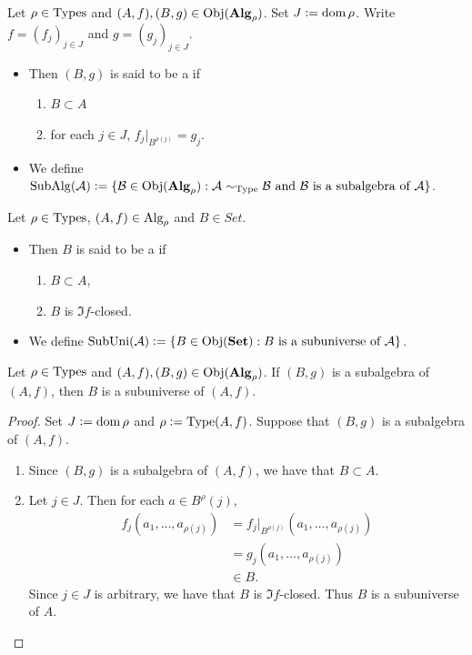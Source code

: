\documentclass{book}
\begin{document}
	\begin{defn}
		Let $\rho \in \operatorname{Types}$ and $(A, f), (B, g) \in \operatorname{Obj}(\operatorname*{\text{\textbf{Alg}}}_\rho)$. Set $J \vcentcolon= \operatorname{dom} \rho$. Write $f = (f_j)_{j \in J}$ and $g = (g_j)_{j \in J}$. 
		\begin{itemize}
			\item Then $(B, g)$ is said to be a  if 
			\begin{enumerate}
				\item $B \subset A$ 
				\item for each $j \in J$, $f_j|_{B^{\rho(j)}} = g_j$.
			\end{enumerate}
			\item We define $\operatorname{SubAlg}(\mathcal{A}) \vcentcolon= \{\mathcal{B} \in \operatorname{Obj}(\operatorname*{\text{\textbf{Alg}}}_\rho): \text{$\mathcal{A} \sim_{\operatorname{Type}} \mathcal{B}$ and $\mathcal{B}$ is a subalgebra of $\mathcal{A}$}\}$.
		\end{itemize}
	\end{defn}
	
	\begin{defn}
		Let $\rho \in \operatorname{Types}$, $(A, f) \in \text{Alg}_\rho$ and $B \in Set$. 
		\begin{itemize}
			\item Then $B$ is said to be a \tbf{subuniverse of $(A, f)$} if 
			\begin{enumerate}
				\item $B \subset A$,
				\item $B$ is $\Im f$-closed.
			\end{enumerate}
			\item We define $\operatorname{SubUni}(\mathcal{A}) \vcentcolon= \{B \in \operatorname{Obj}(\text{\textbf{Set}}): \text{$B$ is a subuniverse of $\mathcal{A}$}\}$.
		\end{itemize}
	\end{defn}
	
	\begin{ex}
		Let $\rho \in \operatorname{Types}$ and $(A, f), (B, g) \in \operatorname{Obj}(\operatorname*{\text{\textbf{Alg}}}_{\rho})$. If $(B, g)$ is a subalgebra of $(A, f)$, then $B$ is a subuniverse of $(A,f)$. 
	\end{ex}
	
	\begin{proof}
		Set $J \vcentcolon= \operatorname{dom} \rho$ and $\rho \vcentcolon= \operatorname{Type}(A, f)$. Suppose that $(B, g)$ is a subalgebra of $(A, f)$. 
		\begin{enumerate}
			\item Since $(B, g)$ is a subalgebra of $(A, f)$, we have that $B \subset A$.
			\item Let $j \in J$. Then for each $a \in B^\rho(j)$, 
			\begin{align*}
				f_j(a_1, \ldots, a_{\rho(j)})
				& = f_j|_{B^{\rho(j)}}(a_1, \ldots, a_{\rho(j)}) \\
				& = g_j(a_1, \ldots, a_{\rho(j)}) \\
				& \in B.
			\end{align*}
			Since $j \in J$ is arbitrary, we have that $B$ is $\Im f$-closed. Thus $B$ is a subuniverse of $A$.
		\end{enumerate}
	\end{proof}
\end{document}
